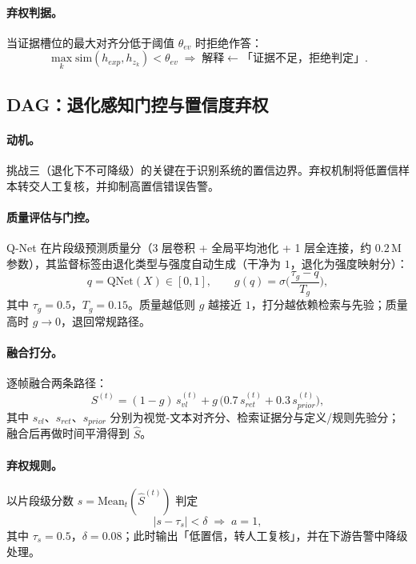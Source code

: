 \paragraph{弃权判据。} 当证据槽位的最大对齐分低于阈值 $\theta_{ev}$ 时拒绝作答：
\begin{equation}
\max_k \mathrm{sim}(h_{exp}, h_{z_k}) < \theta_{ev} \;\Longrightarrow\; \text{解释} \leftarrow \text{「证据不足，拒绝判定」}.
\end{equation}

\subsection{DAG：退化感知门控与置信度弃权}

\paragraph{动机。} 挑战三（退化下不可降级）的关键在于识别系统的置信边界。弃权机制将低置信样本转交人工复核，并抑制高置信错误告警。

\paragraph{质量评估与门控。} Q-Net 在片段级预测质量分（3 层卷积 + 全局平均池化 + 1 层全连接，约 $0.2$\,M 参数），其监督标签由退化类型与强度自动生成（干净为 $1$，退化为强度映射分）：
\begin{equation}
q = \mathrm{QNet}(X) \in [0,1], \qquad
g(q) = \sigma\!\Big(\frac{\tau_g - q}{T_g}\Big),
\end{equation}
其中 $\tau_g{=}0.5$，$T_g{=}0.15$。质量越低则 $g$ 越接近 $1$，打分越依赖检索与先验；质量高时 $g \to 0$，退回常规路径。

\paragraph{融合打分。} 逐帧融合两条路径：
\begin{equation}
S^{(t)} = (1 - g)\, s_{vl}^{(t)} + g\,\big(0.7\, s_{ret}^{(t)} + 0.3\, s_{prior}^{(t)}\big),
\end{equation}
其中 $s_{vl}$、$s_{ret}$、$s_{prior}$ 分别为视觉-文本对齐分、检索证据分与定义/规则先验分；融合后再做时间平滑得到 $\hat{S}$。

\paragraph{弃权规则。} 以片段级分数 $s = \mathrm{Mean}_t(\hat{S}^{(t)})$ 判定
\begin{equation}
\lvert s - \tau_s \rvert < \delta \;\Longrightarrow\; a = 1,
\end{equation}
其中 $\tau_s{=}0.5$，$\delta{=}0.08$；此时输出「低置信，转人工复核」，并在下游告警中降级处理。

